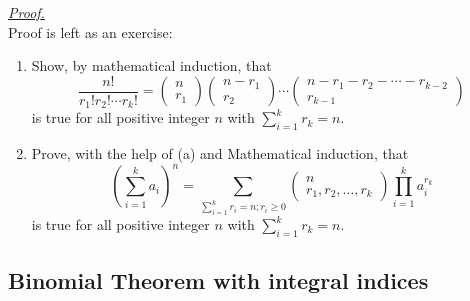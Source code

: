 \documentclass[12pt]{article}
\renewenvironment{proof}[1][Proof]{\begin{snugshade*} \underline{\textit{{#1}.}}\\}{\hfill \qedsymbol \end{snugshade*}}
\begin{document}
    \begin{proof}
        Proof is left as an exercise:\begin{enumerate}
            \item Show, by mathematical induction, that \[\frac{n!}{r_1!r_2!\cdots r_k!}=\begin{pmatrix}
                n\\r_1
            \end{pmatrix}\begin{pmatrix}
                n-r_1\\r_2
            \end{pmatrix}\cdots\begin{pmatrix}
                n-r_1-r_2-\cdots-r_{k-2}\\r_{k-1}
            \end{pmatrix}\] is true for all positive integer $n$ with $\sum_{i=1}^{k}r_k=n$.
            \item Prove, with the help of (a) and Mathematical induction, that \[(\sum_{i=1}^{k}a_i)^n=\sum_{\sum_{i=1}^{k}r_i=n; r_i\geq 0}\begin{pmatrix}
                n\\r_1,r_2,\dots,r_k
            \end{pmatrix}\prod_{i=1}^k a_i^{r_k}\] is true for all positive integer $n$ with $\sum_{i=1}^{k}r_k=n$.
        \end{enumerate}
    \end{proof}

    \subsection{Binomial Theorem with integral indices}
\end{document}
